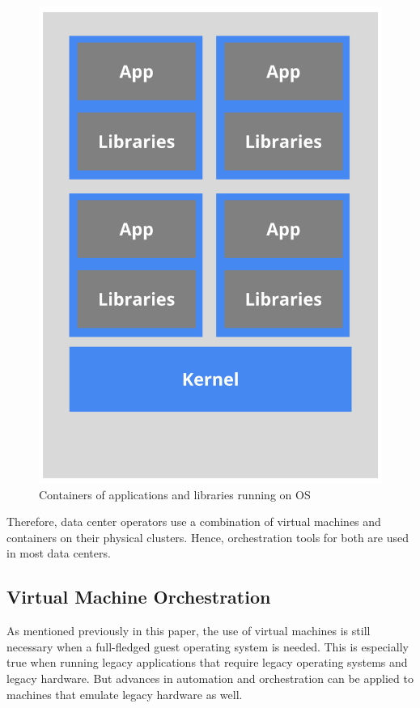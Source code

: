 \documentclass[10pt,twocolumn]{article}
\begin{document}
\begin{figure}[thpb]
  \centering
  	\includegraphics[width=\columnwidth]{container_app_libs}
    \caption{Containers of applications and libraries running on OS ~\cite{container_shared_lib}}
	\label{fig:container_app_libs}
\end{figure}

Therefore, data center operators use a combination of virtual machines and containers on their physical clusters.
Hence, orchestration tools for both are used in most data centers.

\subsection{Virtual Machine Orchestration}

As mentioned previously in this paper, the use of virtual machines is still necessary when a full-fledged guest operating system is needed.
This is especially true when running legacy applications that require legacy operating systems and legacy hardware.
But advances in automation and orchestration can be applied to machines that emulate legacy hardware as well.
\end{document}
